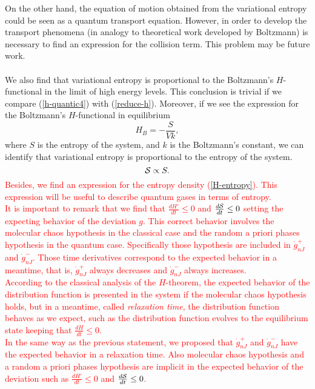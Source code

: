 On the other hand, the equation of motion obtained from the variational entropy could be seen as a quantum transport equation. However, in order to develop the transport phenomena (in analogy to theoretical work developed by Boltzmann) is necessary to find an expression for the collision term. This problem may be future work.\\
\\
We also find that variational entropy is proportional to the Boltzmann's $H$-functional in the limit of high energy levels. This conclusion is trivial if we compare (\ref{h-quantic4}) with (\ref{reduce-h}). Moreover, if we see the expression for the Boltzmann's $H$-functional in equilibrium
\begin{equation}
    H_{B}=-\frac{S}{Vk},
\end{equation}
where $S$ is the entropy of the system, and $k$ is the Boltzmann's constant, we can identify that variational entropy is proportional to the entropy of the system.\\
\begin{equation}
    \mathcal{S}\propto S.
\end{equation}
\textcolor{red}{Besides, we find an expression for the entropy density (\ref{H-entropy}). This expression will be useful to describe quantum gases in terms of entropy.\\
It is important to remark that we find that $\frac{dH'}{dt}\leq 0$ and $\frac{d\mathcal{S}}{dt}\leq 0$ setting the expecting behavior of the deviation $g$. This correct behavior involves the molecular chaos hypothesis in the classical case and the random a priori phases hypothesis in the quantum case. Specifically those hypothesis are included in $\dot{g}_{nJ}^{+}$ and $\dot{g}_{nJ}^{-}$. Those time derivatives correspond to the expected behavior in a meantime, that is, $\dot{g}_{nJ}^{+}$ always decreases and $\dot{g}_{nJ}^{-}$ always increases.\\ 
According to the classical analysis of the $H$-theorem, the expected behavior of the distribution function is presented in the system if the molecular chaos hypothesis holds, but in a meantime, called \textit{relaxation time}, the distribution function behaves as we expect, such as the distribution function evolves to the equilibrium state keeping that $\frac{dH}{dt}\leq 0$.\\
In the same way as the previous statement, we proposed that $\dot{g}_{nJ}^{+}$ and $\dot{g}_{nJ}^{-}$ have the expected behavior in a relaxation time. Also molecular chaos hypothesis and a random a priori phases hypothesis are implicit in the expected behavior of the deviation such as $\frac{dH'}{dt}\leq 0$ and $\frac{d\mathcal{S}}{dt}\leq 0$.}


